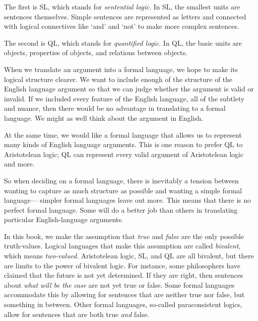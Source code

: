 The first is SL, which stands for \emph{sentential logic}. In SL, the smallest units are sentences themselves. Simple sentences are represented as letters and connected with {logical connectives} like `and' and `not' to make more complex sentences.

The second is QL, which stands for \emph{quantified logic}. In QL, the basic units are objects, properties of objects, and relations between objects.




When we translate an argument into a formal language, we hope to make its logical structure clearer. We want to include enough of the structure of the English language argument so that we can judge whether the argument is valid or invalid. If we included every feature of the English language, all of the subtlety and nuance, then there would be no advantage in translating to a formal language. We might as well think about the argument in English.

At the same time, we would like a formal language that allows us to represent many kinds of English language arguments. This is one reason to prefer QL to Aristotelean logic; QL can represent every valid argument of Aristotelean logic and more.



So when deciding on a formal language, there is inevitably a tension between wanting to capture as much structure as possible and wanting a simple formal language--- simpler formal languages leave out more. This means that there is no perfect formal language. Some will do a better job than others in translating particular English-language arguments.

In this book, we make the assumption that \emph{true} and \emph{false} are the only possible truth-values. Logical languages that make this assumption are called \emph{bivalent}, which means \emph{two-valued}. Aristotelean logic, SL, and QL are all bivalent, but there are limits to the power of bivalent logic. For instance, some philosophers have claimed that the future is not yet determined. If they are right, then sentences about \emph{what will be the case} are not yet true or false.
Some formal languages accommodate this by allowing for sentences that are neither true nor false, but something in between.
Other formal languages, so-called paraconsistent logics, allow for sentences that are both true \emph{and} false.

